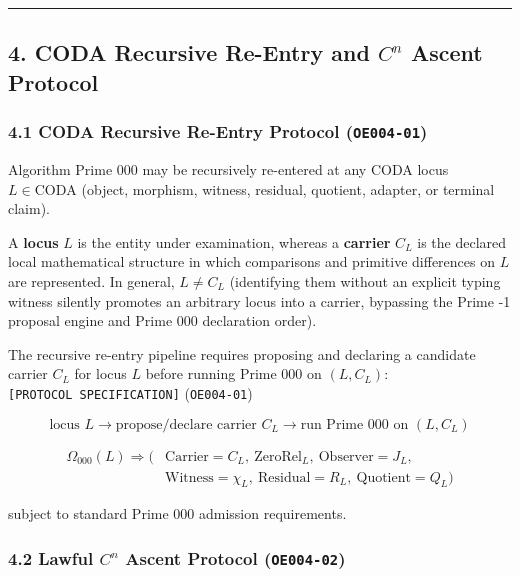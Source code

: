 \documentclass[
  11pt,
]{article}
\renewcommand{\_}{\origunderscore\allowbreak}
\begin{document}
\begin{center}\rule{0.5\linewidth}{0.5pt}\end{center}

\subsection{\texorpdfstring{4. CODA Recursive Re-Entry and \(C^n\)
Ascent
Protocol}{4. CODA Recursive Re-Entry and C\^{}n Ascent Protocol}}\label{coda-recursive-re-entry-and-cn-ascent-protocol}

\subsubsection{\texorpdfstring{4.1 CODA Recursive Re-Entry Protocol
(\texttt{OE004-01})}{4.1 CODA Recursive Re-Entry Protocol (OE004-01)}}\label{coda-recursive-re-entry-protocol-oe004-01}

Algorithm Prime 000 may be recursively re-entered at any CODA locus
\(L \in \text{CODA}\) (object, morphism, witness, residual, quotient,
adapter, or terminal claim).

A \textbf{locus} \(L\) is the entity under examination, whereas a
\textbf{carrier} \(C_L\) is the declared local mathematical structure in
which comparisons and primitive differences on \(L\) are represented. In
general, \(L \neq C_L\) (identifying them without an explicit typing
witness silently promotes an arbitrary locus into a carrier, bypassing
the Prime -1 proposal engine and Prime 000 declaration order).

The recursive re-entry pipeline requires proposing and declaring a
candidate carrier \(C_L\) for locus \(L\) before running Prime 000 on
\((L, C_L)\): \texttt{{[}PROTOCOL\ SPECIFICATION{]}} (\texttt{OE004-01})

\[\boxed{\text{locus } L \longrightarrow \text{propose/declare carrier } C_L \longrightarrow \text{run Prime 000 on } (L, C_L)}\]

\[\begin{aligned}
\Omega_{000}(L) \Longrightarrow \bigl(&\text{Carrier}=C_L,\ \mathrm{ZeroRel}_L,\ \text{Observer}=J_L, \\
&\text{Witness}=\chi_L,\ \text{Residual}=R_L,\ \text{Quotient}=Q_L \bigr)
\end{aligned}\]

subject to standard Prime 000 admission requirements.

\subsubsection{\texorpdfstring{4.2 Lawful \(C^n\) Ascent Protocol
(\texttt{OE004-02})}{4.2 Lawful C\^{}n Ascent Protocol (OE004-02)}}\label{lawful-cn-ascent-protocol-oe004-02}
\end{document}
